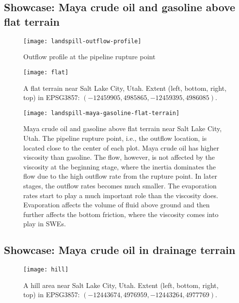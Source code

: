 \subsection{Showcase: Maya crude oil and gasoline above flat terrain}

\begin{figure}
    \centering
    \texttt{[image: landspill-outflow-profile]}
    \caption{Outflow profile at the pipeline rupture point}
    \label{fig:outflow-profile}
\end{figure}

\begin{figure}
    \centering
    \texttt{[image: flat]}
    \caption{%
        A flat terrain near Salt Lake City, Utah. %
        Extent (left, bottom, right, top) in EPSG3857: $(-12459905, 4985865, -12459395, 4986085)$.
    }
    \label{fig:flat-terrain-satellite}
\end{figure}

\begin{figure*}
    \texttt{[image: landspill-maya-gasoline-flat-terrain]}
    \caption{%
        Maya crude oil and gasoline above flat terrain near Salt Lake City, Utah. %
        The pipeline rupture point, i.e., the outflow location, is located close to the center of each plot. %
        Maya crude oil has higher viscosity than gasoline. %
        The flow, however, is not affected by the viscosity at the beginning stage, where the inertia dominates the flow due to the high outflow rate from the rupture point. %
        In later stages, the outflow rates becomes much smaller. %
        The evaporation rates start to play a much important role than the viscosity does. %
        Evaporation affects the volume of fluid above ground and then further affects the bottom friction, where the viscosity comes into play in SWEs.%
    }
    \label{fig:landspill-maya-gasoline-flat}
\end{figure*}

\subsection{Showcase: Maya crude oil in drainage terrain}

\begin{figure}
    \centering
    \texttt{[image: hill]}
    \caption{%
        A hill area near Salt Lake City, Utah. %
        Extent (left, bottom, right, top) in EPSG3857: $(-12443674, 4976959, -12443264, 4977769)$.
    }
    \label{fig:hill-terrain-satellite}
\end{figure}

